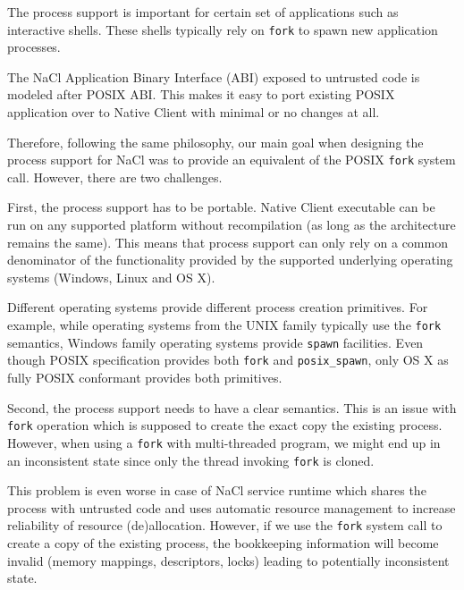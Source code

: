 The process support is important for certain set of applications such
as interactive shells. These shells typically rely on \lstinline`fork` to
spawn new application processes. 


The NaCl Application Binary Interface (ABI) exposed to untrusted code is
modeled after POSIX ABI. This makes it easy to port existing POSIX
application over to Native Client with minimal or no changes at all.

Therefore, following the same philosophy, our main goal when designing
the process support for NaCl was to provide an equivalent of the POSIX
\lstinline`fork` system call. However, there are two challenges.

First, the process support has to be portable. Native Client executable
can be run on any supported platform without recompilation (as long as
the architecture remains the same). This means that process support can
only rely on a common denominator of the functionality provided by the
supported underlying operating systems (\ie Windows, Linux and OS X).

Different operating systems provide different process creation
primitives. For example, while operating systems from the UNIX family
typically use the \lstinline`fork` semantics, Windows family operating
systems provide \lstinline`spawn` facilities. Even though POSIX
specification provides both \lstinline`fork` and \lstinline`posix_spawn`,
only OS X as fully POSIX conformant provides both primitives.

Second, the process support needs to have a clear semantics. This is an
issue with \lstinline`fork` operation which is supposed to create the
exact copy the existing process. However, when using a \lstinline`fork`
with multi-threaded program, we might end up in an inconsistent state
since only the thread invoking \lstinline`fork` is cloned.

This problem is even worse in case of NaCl service runtime which shares
the process with untrusted code and uses automatic resource management
to increase reliability of resource (de)allocation. However, if we use
the \lstinline`fork` system call to create a copy of the existing process,
the bookkeeping information will become invalid (\eg memory mappings,
descriptors, locks) leading to potentially inconsistent state.


